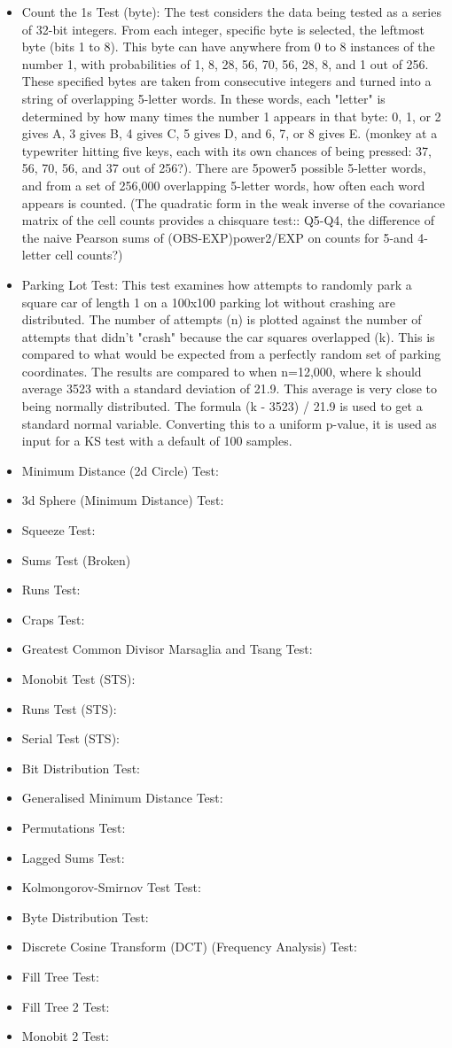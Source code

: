 \begin{itemize}
\item Count the 1s Test (byte): The test considers the data being tested as a series of 32-bit integers. From each integer, specific byte is selected, the leftmost byte (bits 1 to 8). This byte can have anywhere from 0 to 8 instances of the number 1, with probabilities of 1, 8, 28, 56, 70, 56, 28, 8, and 1 out of 256. These specified bytes are taken from consecutive integers and turned into a string of overlapping 5-letter words. In these words, each "letter" is determined by how many times the number 1 appears in that byte: 0, 1, or 2 gives A, 3 gives B, 4 gives C, 5 gives D, and 6, 7, or 8 gives E. (monkey at a typewriter hitting five keys, each with its own chances of being pressed: 37, 56, 70, 56, and 37 out of 256?). There are 5power5 possible 5-letter words, and from a set of 256,000 overlapping 5-letter words, how often each word appears is counted. (The quadratic form in the weak inverse of the covariance matrix of the cell counts provides a chisquare test::  Q5-Q4, the difference of the naive Pearson  sums of (OBS-EXP)power2/EXP on counts for 5-and 4-letter cell counts?)
\item Parking Lot Test: This test examines how attempts to randomly park a square car of length 1 on a 100x100 parking lot without crashing are distributed. The number of attempts (n) is plotted against the number of attempts that didn't "crash" because the car squares overlapped (k). This is compared to what would be expected from a perfectly random set of parking coordinates. The results are compared to when n=12,000, where k should average 3523 with a standard deviation of 21.9. This average is very close to being normally distributed. The formula (k - 3523) / 21.9 is used to get a standard normal variable. Converting this to a uniform p-value, it is used as input for a KS test with a default of 100 samples.
\item Minimum Distance (2d Circle) Test: 
\item 3d Sphere (Minimum Distance) Test:
\item Squeeze Test:
\item Sums Test (Broken)
\item Runs Test:
\item Craps Test:
\item Greatest Common Divisor Marsaglia and Tsang Test:
\item Monobit Test (STS):
\item Runs Test (STS):
\item Serial Test (STS):
\item Bit Distribution Test:
\item Generalised Minimum Distance Test:
\item Permutations Test:
\item Lagged Sums Test:
\item Kolmongorov-Smirnov Test Test:
\item Byte Distribution Test:
\item Discrete Cosine Transform (DCT) (Frequency Analysis) Test:
\item Fill Tree Test:
\item Fill Tree 2 Test:
\item Monobit 2 Test:
\end{itemize}

